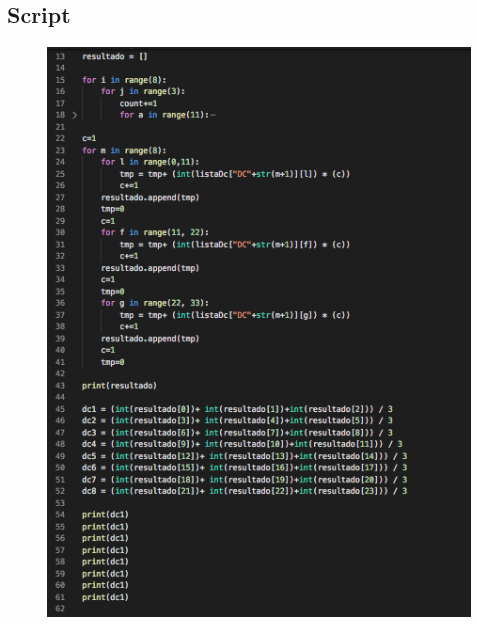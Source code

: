 \begin{apendicesenv}
\chapter{Script}

\begin{figure}[h]
	\centering
	\includegraphics[keepaspectratio=true,scale=0.9]{figuras/script.png}
	\label{script}
\end{figure}

\end{apendicesenv}
